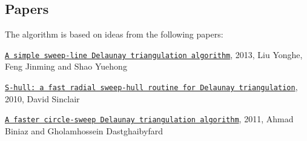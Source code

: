 \subsection*{Papers}

The algorithm is based on ideas from the following papers\+:


\begin{DoxyItemize}
\item \href{http://www.academicpub.org/jao/paperInfo.aspx?paperid=15630}{\tt A simple sweep-\/line Delaunay triangulation algorithm}, 2013, Liu Yonghe, Feng Jinming and Shao Yuehong
\item \href{http://www.s-hull.org/paper/s_hull.pdf}{\tt S-\/hull\+: a fast radial sweep-\/hull routine for Delaunay triangulation}, 2010, David Sinclair
\item \href{http://cglab.ca/~biniaz/papers/Sweep%20Circle.pdf}{\tt A faster circle-\/sweep Delaunay triangulation algorithm}, 2011, Ahmad Biniaz and Gholamhossein Dastghaibyfard 
\end{DoxyItemize}